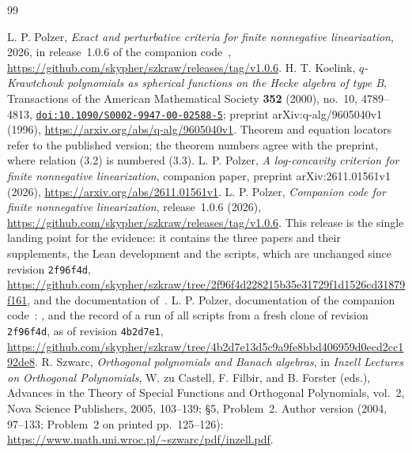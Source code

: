 \begin{thebibliography}{99}

 L. P. Polzer, \emph{Exact and perturbative criteria for finite nonnegative linearization}, 2026, in release~1.0.6 of the companion code~\cite{code}, \url{https://github.com/skypher/szkraw/releases/tag/v1.0.6}.
 H. T. Koelink, \emph{$q$-Krawtchouk polynomials as spherical functions on the Hecke algebra of type B}, Transactions of the American Mathematical Society \textbf{352} (2000), no.~10, 4789--4813, \href{https://doi.org/10.1090/S0002-9947-00-02588-5}{\nolinkurl{doi:10.1090/S0002-9947-00-02588-5}}; preprint arXiv:q-alg/9605040v1 (1996), \url{https://arxiv.org/abs/q-alg/9605040v1}. Theorem and equation locators refer to the published version; the theorem numbers agree with the preprint, where relation (3.2) is numbered (3.3).
 L. P. Polzer, \emph{A log-concavity criterion for finite nonnegative linearization}, companion paper, preprint arXiv:2611.01561v1 (2026), \url{https://arxiv.org/abs/2611.01561v1}.
 L. P. Polzer, \emph{Companion code for finite nonnegative linearization}, release~1.0.6 (2026), \url{https://github.com/skypher/szkraw/releases/tag/v1.0.6}. This release is the single landing point for the evidence: it contains the three papers and their supplements, the Lean development and the scripts, which are unchanged since revision \texttt{2f96f4d}, \url{https://github.com/skypher/szkraw/tree/2f96f4d228215b35e31729f1d1526cd31879f161}, and the documentation of~\cite{docs}.
 L. P. Polzer, documentation of the companion code~\cite{code}: ,  and the record  of a run of all scripts from a fresh clone of revision \texttt{2f96f4d}, as of revision \texttt{4b2d7e1}, \url{https://github.com/skypher/szkraw/tree/4b2d7e13d5c9a9fe8bbd406959d0ecd2cc192de8}.
 R. Szwarc, \emph{Orthogonal polynomials and Banach algebras}, in \emph{Inzell Lectures on Orthogonal Polynomials}, W. zu Castell, F. Filbir, and B. Forster (eds.), Advances in the Theory of Special Functions and Orthogonal Polynomials, vol.~2, Nova Science Publishers, 2005, 103--139; \S5, Problem~2. Author version (2004, 97--133; Problem~2 on printed pp.~125--126): \url{https://www.math.uni.wroc.pl/~szwarc/pdf/inzell.pdf}.
\end{thebibliography}

